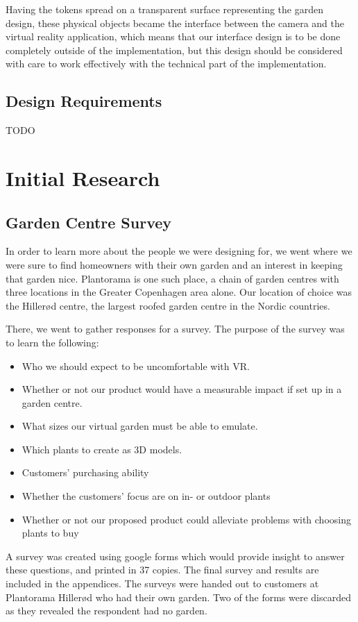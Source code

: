 Having the tokens spread on a transparent surface representing the garden design, these physical objects became the interface between the camera and the virtual reality application, which means that our interface design is to be done completely outside of the implementation, but this design should be considered with care to work effectively with the technical part of the implementation.


\subsection{Design Requirements}
TODO

\section{Initial Research}
\subsection{Garden Centre Survey}

In order to learn more about the people we were designing for, we went where we were sure to find homeowners with their own garden and an interest in keeping that garden nice. Plantorama is one such place, a chain of garden centres with three locations in the Greater Copenhagen area alone. Our location of choice was the Hillerød centre, the largest roofed garden centre in the Nordic countries. 

There, we went to gather responses for a survey. 
The purpose of the survey was to learn the following:

\begin{itemize}
	\item Who we should expect to be uncomfortable with VR.
	\item Whether or not our product would have a measurable impact if set up in a garden centre.
	\item What sizes our virtual garden must be able to emulate.
	\item Which plants to create as 3D models.
	\item Customers' purchasing ability
	\item Whether the customers' focus are on in- or outdoor plants
	\item Whether or not our proposed product could alleviate problems with choosing plants to buy
\end{itemize}
A survey was created using google forms which would provide insight to answer these questions, and printed in 37 copies. The final survey and results are included in the appendices. The surveys were handed out to customers at Plantorama Hillerød who had their own garden. Two of the forms were discarded as they revealed the respondent had no garden. %

